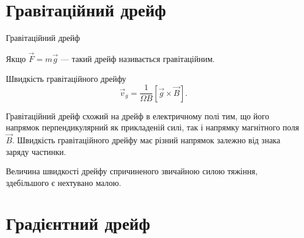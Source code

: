 \documentclass[]{beamer}
\begin{document}




\section{Гравітаційний дрейф}





\begin{frame}{Гравітаційний дрейф}{}
	\begin{block}{}\justifying
		Якщо $\vec{F} = m\vec{g}$ ---  такий дрейф називається \alert{гравітаційним}.
	\end{block}
	\begin{block}{Швидкість гравітаційного дрейфу}
		\begin{equation*}
			\vec{v}_g = \frac{1}{\Omega B}\left[\vec{g}\times\vec{B}\right].
		\end{equation*}
	\end{block}
	\begin{block}{}\justifying
		Гравітаційний дрейф схожий на дрейф в електричному полі тим, що
		його напрямок перпендикулярний як прикладеній силі, так і напрямку магнітного поля $\vec{B}$. Швидкість гравітаційного дрейфу має різний напрямок залежно від знака заряду частинки.
	\end{block}
	\begin{alertblock}{}\justifying
		Величина швидкості дрейфу спричиненого звичайною силою тяжіння, здебільшого є нехтувано малою.
	\end{alertblock}

\end{frame}




\section{Градієнтний дрейф}
\end{document}
